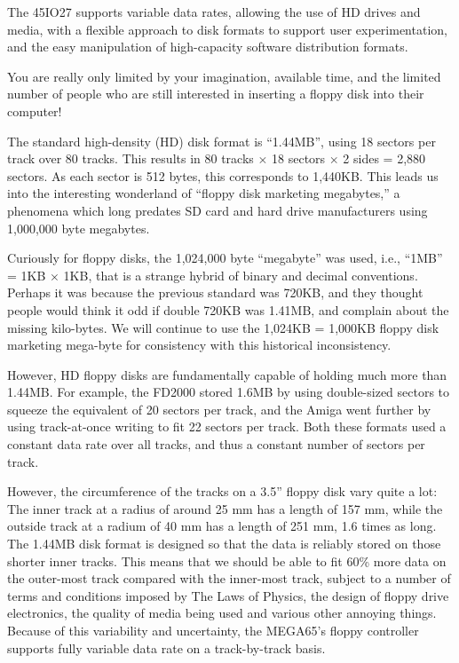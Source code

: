 The 45IO27 supports variable data rates, allowing the use of HD drives and media,
with a flexible approach to disk formats to support user experimentation, and the
easy manipulation of high-capacity software distribution formats.

You are really only limited by your imagination, available time, and
the limited number of people who are still interested in inserting a
floppy disk into their computer!

The standard high-density (HD) disk format is ``1.44MB'', using 18 sectors per track over 80 tracks.
This results in 80 tracks $\times$ 18 sectors $\times$ 2 sides = 2,880 sectors. As each sector
is 512 bytes, this corresponds to 1,440KB.  This leads us into the interesting wonderland of
``floppy disk marketing megabytes,'' a phenomena which long predates SD card and hard drive
manufacturers using 1,000,000 byte megabytes.

Curiously for floppy disks, the 1,024,000 byte ``megabyte'' was used, i.e., ``1MB'' = 1KB $\times$ 1KB,
that is a strange hybrid of binary and decimal conventions.  Perhaps it was because the previous standard
was 720KB, and they thought people would think it odd if double 720KB was 1.41MB, and complain about the
missing kilo-bytes.  We will continue to use the 1,024KB = 1,000KB floppy disk marketing mega-byte for
consistency with this historical inconsistency.

However, HD floppy disks are fundamentally capable of holding much more than 1.44MB. For example, the FD2000
stored 1.6MB by using double-sized sectors to squeeze the equivalent of 20 sectors per track, and the Amiga
went further by using track-at-once writing to fit 22 sectors per track. Both these formats used a constant
data rate over all tracks, and thus a constant number of sectors per track.

However, the circumference of the tracks on a 3.5'' floppy disk vary quite a lot: The inner track at a radius of around 25 mm has a length of 157 mm, while the outside track at a radium of 40 mm has a length of 251 mm, 1.6 times as long.
The 1.44MB disk format is designed so that
the data is reliably stored on those shorter inner tracks.
This means that we should be able to fit 60\%
more data on the outer-most track compared with the inner-most track, subject to a number of terms and conditions
imposed by The Laws of Physics, the design of floppy drive electronics, the quality of media being used and
various other annoying things.
Because of this variability and uncertainty, the MEGA65's floppy controller supports fully variable data rate
on a track-by-track basis.

